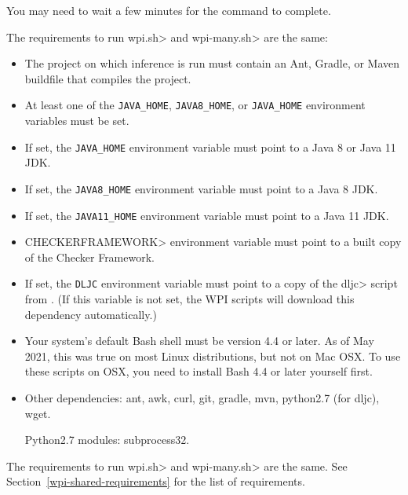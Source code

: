 You may need to wait a few minutes for the command to complete.



The requirements to run \<wpi.sh> and \<wpi-many.sh> are the same:

\begin{itemize}
\item The project on which inference is run must contain an Ant, Gradle,
  or Maven buildfile that compiles the project.
\item At least one of the \verb|JAVA_HOME|, \verb|JAVA8_HOME|, or \verb|JAVA_HOME| environment variables
must be set.
\item If set, the \verb|JAVA_HOME| environment variable must point to a Java 8 or Java 11 JDK.
\item If set, the \verb|JAVA8_HOME| environment variable must point to a Java 8 JDK.
\item If set, the \verb|JAVA11_HOME| environment variable must point to a Java 11 JDK.
\item \<CHECKERFRAMEWORK> environment variable must point to a built copy of the Checker Framework.
\item If set, the \verb|DLJC| environment variable must point to a copy of the \<dljc> script
from . (If this variable is not
set, the WPI scripts will download this dependency automatically.)
\item Your system's default Bash shell must be version 4.4 or later.  As of May 2021, this was true
on most Linux distributions, but not on Mac OSX. To use these scripts on OSX, you need to
install Bash 4.4 or later yourself first.
\item Other dependencies:
  ant,
  awk,
  curl,
  git,
  gradle,
  mvn,
  python2.7 (for dljc),
  wget.

  Python2.7 modules:
  subprocess32.
\end{itemize}




The requirements to run \<wpi.sh> and \<wpi-many.sh> are the same. See Section~\ref{wpi-shared-requirements}
for the list of requirements.

